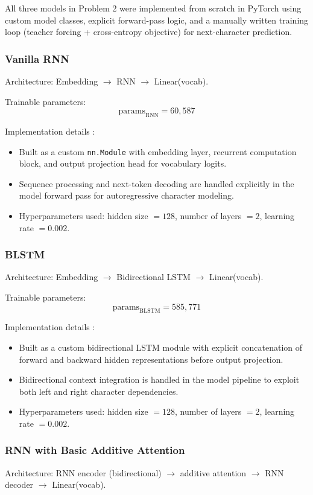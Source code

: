 \documentclass[11pt,a4paper]{article}
\begin{document}
All three models in Problem 2 were implemented from scratch in PyTorch using custom model classes, explicit forward-pass logic, and a manually written training loop (teacher forcing + cross-entropy objective) for next-character prediction.

\subsubsection{Vanilla RNN}
Architecture: Embedding $\rightarrow$ RNN $\rightarrow$ Linear(vocab).

Trainable parameters:
\[
\text{params}_{\text{RNN}} = 60,587
\]

Implementation details :
\begin{itemize}[leftmargin=1.5em]
    \item Built as a custom \texttt{nn.Module} with embedding layer, recurrent computation block, and output projection head for vocabulary logits.
    \item Sequence processing and next-token decoding are handled explicitly in the model forward pass for autoregressive character modeling.
    \item Hyperparameters used: hidden size $=128$, number of layers $=2$, learning rate $=0.002$.
\end{itemize}


\subsubsection{BLSTM}
Architecture: Embedding $\rightarrow$ Bidirectional LSTM $\rightarrow$ Linear(vocab).

Trainable parameters:
\[
\text{params}_{\text{BLSTM}} = 585,771
\]

Implementation details :
\begin{itemize}[leftmargin=1.5em]
    \item Built as a custom bidirectional LSTM module with explicit concatenation of forward and backward hidden representations before output projection.
    \item Bidirectional context integration is handled in the model pipeline to exploit both left and right character dependencies.
    \item Hyperparameters used: hidden size $=128$, number of layers $=2$, learning rate $=0.002$.
\end{itemize}

\subsubsection{RNN with Basic Additive Attention}
Architecture: RNN encoder (bidirectional) $\rightarrow$ additive attention $\rightarrow$ RNN decoder $\rightarrow$ Linear(vocab).
\end{document}
